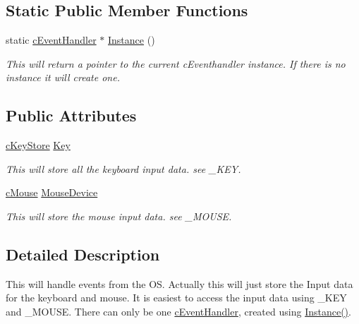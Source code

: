 \subsection*{Static Public Member Functions}
\begin{DoxyCompactItemize}
\item 
\hypertarget{classc_event_handler_a8cf5519e1f3c5f6a6f79f9da75fb2750}{
static \hyperlink{classc_event_handler}{cEventHandler} $\ast$ \hyperlink{classc_event_handler_a8cf5519e1f3c5f6a6f79f9da75fb2750}{Instance} ()}
\label{classc_event_handler_a8cf5519e1f3c5f6a6f79f9da75fb2750}

\begin{DoxyCompactList}\small\item\em This will return a pointer to the current cEventhandler instance. If there is no instance it will create one. \end{DoxyCompactList}\end{DoxyCompactItemize}
\subsection*{Public Attributes}
\begin{DoxyCompactItemize}
\item 
\hypertarget{classc_event_handler_a53ba15cada383fb64c9918d8ce923585}{
\hyperlink{classc_key_store}{cKeyStore} \hyperlink{classc_event_handler_a53ba15cada383fb64c9918d8ce923585}{Key}}
\label{classc_event_handler_a53ba15cada383fb64c9918d8ce923585}

\begin{DoxyCompactList}\small\item\em This will store all the keyboard input data. see \_\-KEY. \end{DoxyCompactList}\item 
\hypertarget{classc_event_handler_a5d871cf2ddea710db2b4daed30cd1866}{
\hyperlink{classc_mouse}{cMouse} \hyperlink{classc_event_handler_a5d871cf2ddea710db2b4daed30cd1866}{MouseDevice}}
\label{classc_event_handler_a5d871cf2ddea710db2b4daed30cd1866}

\begin{DoxyCompactList}\small\item\em This will store the mouse input data. see \_\-MOUSE. \end{DoxyCompactList}\end{DoxyCompactItemize}


\subsection{Detailed Description}
This will handle events from the OS. Actually this will just store the Input data for the keyboard and mouse. It is easiest to access the input data using \_\-KEY and \_\-MOUSE. There can only be one \hyperlink{classc_event_handler}{cEventHandler}, created using \hyperlink{classc_event_handler_a8cf5519e1f3c5f6a6f79f9da75fb2750}{Instance()}. 
